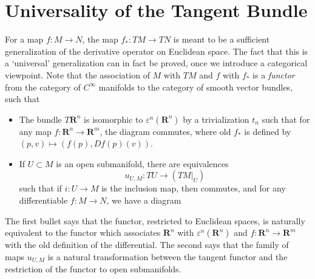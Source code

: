 \section{Universality of the Tangent Bundle}

For a map $f:M \to N$, the map $f_*: TM \to TN$ is meant to be a sufficient generalization of the derivative operator on Euclidean space. The fact that this is a `universal' generalization can in fact be proved, once we introduce a categorical viewpoint. Note that the association of $M$ with $TM$ and $f$ with $f_*$ is a {\it functor} from the category of $C^\infty$ manifolds to the category of smooth vector bundles, such that
%
\begin{itemize}
    \item The bundle $T\mathbf{R}^n$ is isomorphic to $\varepsilon^n(\mathbf{R}^n)$ by a trivialization $t_n$ such that for any map $f: \mathbf{R}^n \to \mathbf{R}^m$, the diagram
    commutes, where $\text{old $f_*$}$ is defined by $(p,v) \mapsto (f(p), Df(p)(v))$.
    \item If $U \subset M$ is an open submanifold, there are equivalences
    \[ u_{U,M}: TU \to (TM|_U) \]
    such that if $i: U \to M$ is the inclusion map, then
    commutes, and for any differentiable $f:M \to N$, we have a diagram
\end{itemize}
%
The first bullet says that the functor, restricted to Euclidean spaces, is naturally equivalent to the functor which associates $\mathbf{R}^n$ with $\varepsilon^n(\mathbf{R}^n)$ and $f: \mathbf{R}^n \to \mathbf{R}^m$ with the old definition of the differential. The second says that the family of maps $u_{U,M}$ is a natural transformation between the tangent functor and the restriction of the functor to open submanifolds.

